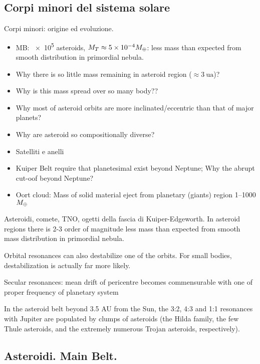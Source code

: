 \subsection{Corpi minori del sistema solare}

\begin{frame}{Corpi minori: origine ed evoluzione.}
\begin{itemize}
\item MB: \num{e5} asteroids, $M_{T}\approx\num{5e-4}M_{\oplus}{}$: less mass than expected from smooth distribution in primordial nebula.
\item Why there is so little mass remaining in asteroid region ($\approx\SI{3}{\astronomicalunit}$)? 
\item Why is this mass spread over so many body??
\item Why most of asteroid orbits are more inclinated/eccentric than that of major planets?
\item Why are asteroid so compositionally diverse?
\item Satelliti e anelli
\item Kuiper Belt require that planetesimal exist beyond Neptune; Why the abrupt cut-oof beyond Neptune?
\item Oort cloud: Mass of solid material eject from planetary (giants) region \numrange{1}{1000}$M_{\oplus}{}$
\end{itemize}
\end{frame}

\begin{wordonframe}{Asteroidi, comete, TNO, ogetti della fascia di Kuiper-Edgeworth.}
In asteroid regions there is 2-3 order of magnitude less mass than expected from smooth mass distribution in primordial nebula.

Orbital resonances can also destabilize one of the orbits. For small bodies, destabilization is actually far more likely.

Secular resonances: mean drift of pericentre becomes commensurable with one of proper frequency of planetary system

In the asteroid belt beyond 3.5 AU from the Sun, the 3:2, 4:3 and 1:1 resonances with Jupiter are populated by clumps of asteroids (the Hilda family, the few Thule asteroids, and the extremely numerous Trojan asteroids, respectively).
\end{wordonframe}

\subsection{Asteroidi. Main Belt.}

